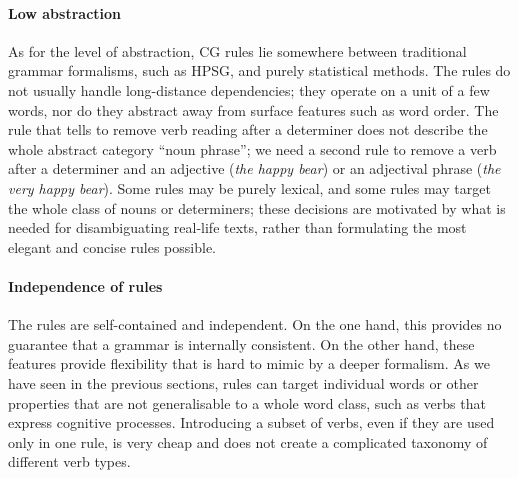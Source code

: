 {%



\paragraph{Low abstraction} 

As for the level of abstraction, CG rules lie somewhere between 
traditional grammar formalisms, such as HPSG, and purely statistical methods.
The rules do not usually handle long-distance dependencies; 
they operate on a unit of a few words, nor do they abstract away from surface features such as word order.
The rule that tells to remove verb reading after a determiner
does not describe the whole abstract category ``noun phrase''; we need a second
rule to remove a verb after a determiner and an adjective (\emph{the happy bear}) 
or an adjectival phrase (\emph{the very happy bear}).
Some rules may be purely lexical, and some rules may target the whole class of nouns or determiners; these decisions are motivated by what is needed for disambiguating real-life texts, rather than formulating the most elegant and concise rules possible.



\paragraph{Independence of rules}
The rules are self-contained and independent.
On the one hand, this provides no guarantee that a grammar is internally consistent.
On the other hand, these features provide flexibility that is hard to mimic by a deeper formalism.
As we have seen in the previous sections, rules can target individual words
or other properties that are not generalisable to a whole word class,
such as verbs that express cognitive processes.
Introducing a subset of verbs, even if they are used only in one rule,
is very cheap and does not create a complicated taxonomy of different verb types.

}
